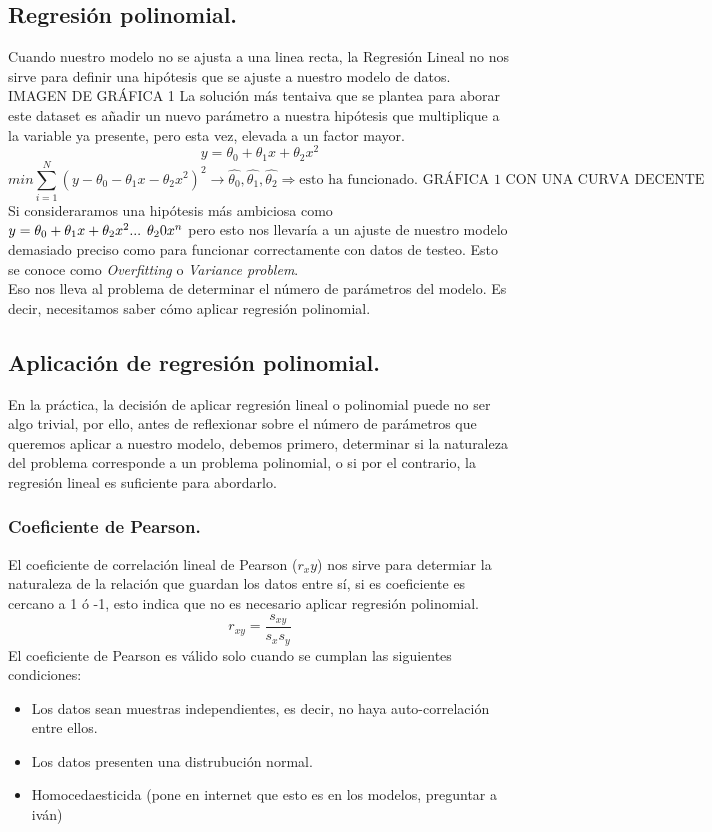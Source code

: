\documentclass[a4paper,10pt]{article}
\begin{document}
\subsection{Regresión polinomial.}

Cuando nuestro modelo no se ajusta a una linea recta, la Regresión Lineal no nos sirve para definir una hipótesis que se ajuste a nuestro modelo de datos.
IMAGEN DE GRÁFICA 1
La solución más tentaiva que se plantea para aborar este dataset es añadir un nuevo parámetro a nuestra hipótesis que multiplique a la variable ya presente, pero esta vez, elevada a un factor mayor. 
\[
 y=\theta_0+\theta_1 x+\theta_2 x^2
\]
\[
 min\sum_{i=1}^{N}(y-\theta_0-\theta_1 x-\theta_2 x^2)^2\longrightarrow \hat{\theta_0},\hat{\theta_1},\hat{\theta_2} \Rightarrow \text{esto ha funcionado. GRÁFICA 1 CON UNA CURVA DECENTE}
\] 
Si consideraramos una hipótesis más ambiciosa como $y=\theta_0+\theta_1 x+\theta_2 x^2 ...\hspace{0.15cm} \theta_20 x^n$ pero esto nos llevaría a un ajuste de nuestro modelo demasiado preciso como para funcionar correctamente con datos de testeo. Esto se conoce como \textit{Overfitting} o \textit{Variance problem}.
\\Eso nos lleva al problema de determinar el número de parámetros del modelo. Es decir, necesitamos saber cómo aplicar regresión polinomial.
\subsection{Aplicación de regresión polinomial.}

En la práctica, la decisión de aplicar regresión lineal o polinomial puede no ser algo trivial, por ello, antes de reflexionar sobre el número de parámetros que queremos aplicar a nuestro modelo, debemos primero, determinar si la naturaleza del problema corresponde a un problema polinomial, o si por el contrario, la regresión lineal es suficiente para abordarlo.
\subsubsection{Coeficiente de Pearson.}

El coeficiente de correlación lineal de Pearson ($r_xy$) nos sirve para determiar la naturaleza de la relación que guardan los datos entre sí, si es coeficiente es cercano a 1 ó -1, esto indica que no es necesario aplicar regresión polinomial.
\[
r_{xy}=\frac{s_{xy}}{s_x s_y}
\]
El coeficiente de Pearson es válido solo cuando se cumplan las siguientes condiciones:
\begin{itemize}
    \item Los datos sean muestras independientes, es decir, no haya auto-correlación entre ellos.
    \item Los datos presenten una distrubución normal.
    \item Homocedaesticida (pone en internet que esto es en los modelos, preguntar a iván)
\end{itemize}
\end{document}
